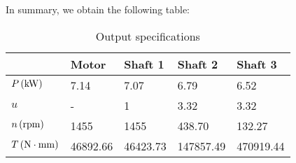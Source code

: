 In summary, we obtain the following table:
\begin{table}[ht]
	\centering
	\begin{tabular}{lllll}
		&Motor    & Shaft 1  & Shaft 2  & Shaft 3   \\\toprule
		$ P \, (\mathrm{kW})$ & 7.14  & 7.07   & 6.79   & 6.52   \\
		$ u $ &       -   &1    &  3.32  & 3.32                 \\
		$ n \, (\mathrm{rpm})$ & 1455 & 1455  & 438.70 & 132.27 \\
		$ T \, (\mathrm{N\cdot mm})$ & 46892.66 & 46423.73 & 147857.49 & 470919.44
	\end{tabular}
	\caption{Output specifications}
	\label{tab:my-table}
\end{table}


